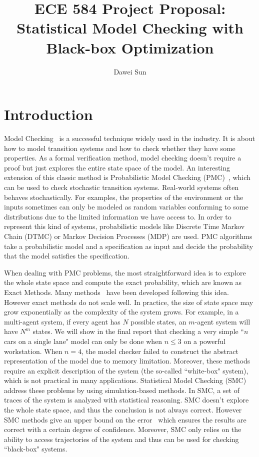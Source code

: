 \documentclass[11pt]{article}
\begin{document}
\author{Dawei Sun}
\title{ECE 584 Project Proposal: Statistical Model Checking with Black-box Optimization}
\maketitle

\section{Introduction}
Model Checking~\cite{clarke2018model} is a successful technique widely used in the industry. It is about how to model transition systems and how to check whether they have some properties. As a formal verification method, model checking doesn't require a proof but just explores the entire state space of the model. An interesting extension of this classic method is Probabilistic Model Checking (PMC)~\cite{ciesinski2004probabilistic}, which can be used to check stochastic transition systems. Real-world systems often behaves stochastically. For examples, the properties of the environment or the inputs sometimes can only be modeled as random variables conforming to some distributions due to the limited information we have access to. In order to represent this kind of systems, probabilistic models like Discrete Time Markov Chain (DTMC) or Markov Decision Processes (MDP) are used. PMC algorithms take a probabilistic model and a specification as input and decide the probability that the model satisfies the specification.

When dealing with PMC problems, the most straightforward idea is to explore the whole state space and compute the exact probability, which are known as Exact Methods. Many methods~\cite{ciesinski2004probabilistic,kwiatkowska2011prism,baier1997symbolic} have been developed following this idea. However exact methods do not scale well. In practice, the size of state space may grow exponentially as the complexity of the system grows. For example, in a multi-agent system, if every agent has $N$ possible states, an $m$-agent system will have $N^m$ states. We will show in the final report that checking a very simple ``$n$ cars on a single lane" model can only be done when $n \leq 3$ on a powerful workstation. When $n=4$, the model checker failed to construct the abstract representation of the model due to memory limitation. Moreover, these methods require an explicit description of the system (the so-called ``white-box" system), which is not practical in many applications. Statistical Model Checking (SMC)~\cite{agha2018survey} address these problems by using simulation-based methods. In SMC, a set of traces of the system is analyzed with statistical reasoning. SMC doesn't explore the whole state space, and thus the conclusion is not always correct. However SMC methods give an upper bound on the error~\cite{herault2004approximate} which ensures the results are correct with a certain degree of confidence. Moreover, SMC only relies on the ability to access trajectories of the system and thus can be used for checking ``black-box" systems.
\end{document}
